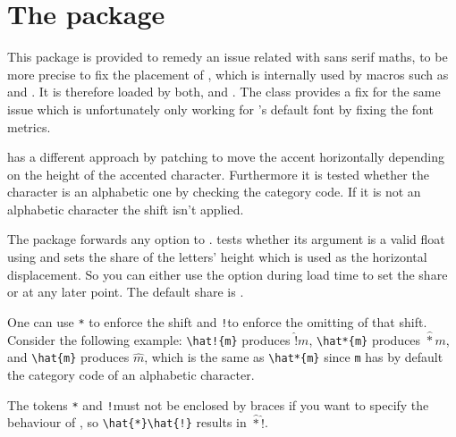 \chapter{The  package}
This package is provided to remedy an issue related with sans serif maths, to be
more precise to fix the placement of , which is internally used
by macros such as  and . It is therefore loaded by both,
 and . The  class provides a fix for the
same issue which is unfortunately only working for 's default font
by fixing the font metrics.

 has a different approach by patching  to move the
accent horizontally depending on the height of the accented character.
Furthermore it is tested whether the character is an alphabetic one by checking
the category code. If it is not an alphabetic character the shift isn't applied.

The package forwards any option to .  tests
whether its argument is a valid float using  and sets the share
of the letters' height which is used as the horizontal displacement. So you can
either use the option during load time to set the share or  at
any later point. The default share is
\makeatletter\texttt{\MRTsfacc@shift}\makeatother.

One can use \texttt{*} to enforce the shift and \texttt{!}\@ to enforce the
omitting of that shift. Consider the following example:
\verb$\hat!{m}$ produces $\hat!{m}$, \verb$\hat*{m}$ produces $\hat*{m}$, and
\verb$\hat{m}$ produces $\hat{m}$, which is the same as \verb$\hat*{m}$ since
\texttt{m} has by default the category code of an alphabetic character.

The tokens \texttt{*} and \texttt{!}\@ must not be enclosed by braces if you
want to specify the behaviour of , so \verb$\hat{*}\hat{!}$
results in $\hat{*}\hat{!}$.

